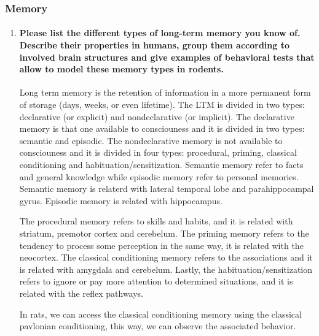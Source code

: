 \documentclass[12pt,article,oneside,a4paper]{memoir}
\begin{document}
\subsubsection{Memory}
\begin{enumerate}
\item \paragraph{Please list the different types of long-term memory you know of.
Describe their properties in humans, group them according to involved brain
structures and give examples of behavioral tests that allow to model these
memory types in rodents.}\label{question:long-term-memory}

Long term memory is the retention of information in a more permanent form of
storage (days, weeks, or even lifetime). The LTM is divided in two types:
declarative (or explicit) and nondeclarative (or implicit).
The declarative memory is that one available to consciouness and it is divided
in two types: semantic and episodic. The nondeclarative memory is not available
to consciouness and it is divided in four types: procedural, priming, classical
conditioning and habituation/sensitization.
Semantic memory refer to facts and general knowledge while episodic memory refer
to personal memories. Semantic memory is relaterd with lateral temporal
lobe and parahippocampal gyrus. Episodic memory is related with hippocampus.

The procedural memory refers to skills and habits, and it is related with
striatum, premotor cortex and cerebelum. The priming memory refers to the
tendency to process some perception in the same way, it is related with the
neocortex. The classical conditioning memory refers to the associations and it
is related with amygdala and cerebelum. Lastly, the habituation/sensitization
refers to ignore or pay more attention to determined situations, and it is
related with the reflex pathways.

In rats, we can access the classical conditioning memory using the classical pavlonian conditioning, this way, we can observe the associated behavior.

\end{enumerate}

\end{document}
